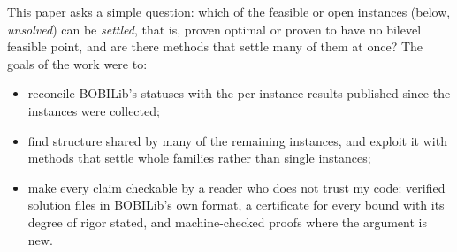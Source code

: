 \documentclass[]{spie}  %
\theoremstyle{plain}
\begin{document}
This paper asks a simple question: which of the \NumUnsolved{} feasible or open instances (below,
\emph{unsolved}) can be \emph{settled}, that is, proven optimal or proven to have no bilevel
feasible point, and are there methods that settle many of them at once? The goals of the work
were to:
\begin{itemize}
\item reconcile BOBILib's statuses with the per-instance results published since the instances
were collected;
\item find structure shared by many of the remaining instances, and exploit it with methods that
settle whole families rather than single instances;
\item make every claim checkable by a reader who does not trust my code: verified solution files
in BOBILib's own format, a certificate for every bound with its degree of rigor stated, and
machine-checked proofs where the argument is new.
\end{itemize}
\end{document}

